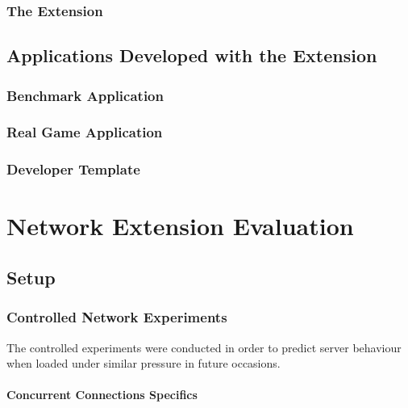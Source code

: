 \documentclass[bsc,frontabs,twoside,singlespacing,parskip,deptreport]{infthesis}     %
\begin{document}
\subsection{The Extension}
\section{Applications Developed with the Extension}
\subsection{Benchmark Application}
\subsection{Real Game Application}
\subsection{Developer Template}







\chapter{Network Extension Evaluation}
\section{Setup}

\subsection{Controlled Network Experiments}
The controlled experiments were conducted in order to predict server behaviour when loaded under similar pressure in future occasions. 

\subsubsection{Concurrent Connections Specifics}
\end{document}
